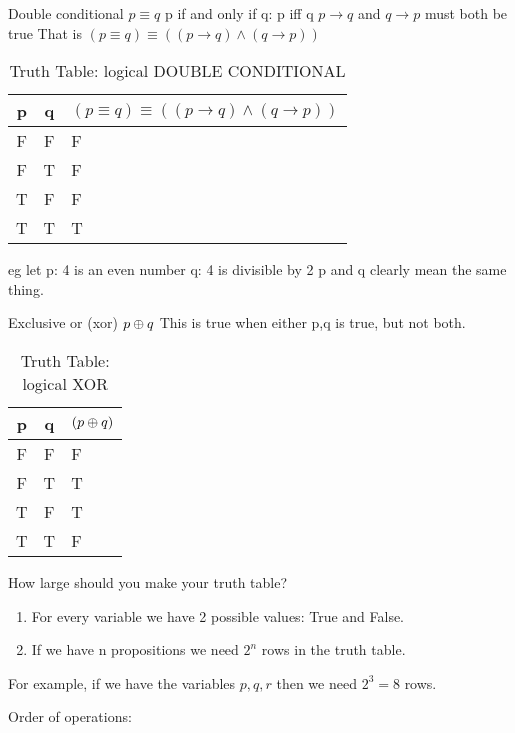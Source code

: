 Double conditional $ p \equiv q $
p if and only if q: p iff q
$p \to q$ and $q \to p$ must both be true
That is $(p \equiv q) \equiv (( p \to q) \land (q \to p))$

\begin{table}[!htb]
\label{tab:TruthTableEQUIVALENCE}
\begin{tabularx}{\linewidth}{| c | c | X |} \hline
  p & q & $( p \equiv q ) \equiv (( p \to q) \land (q \to p))$
                                                    \\ \hline \hline
  F & F & F \\ \hline
  F & T & F \\ \hline
  T & F & F \\ \hline
  T & T & T \\ \hline
\end{tabularx}
\caption{Truth Table: logical DOUBLE CONDITIONAL}
\end{table}

eg let p: 4 is an even number
       q: 4 is divisible by 2
       p and q clearly mean the same thing.
       
Exclusive or (xor) $p \oplus q$
This is true when either p,q is true, but not both.

\begin{table}[!htb]
\label{tab:TruthTableXOR}
\begin{tabularx}{\linewidth}{| c | c | X |} \hline
  p & q & $( p \oplus q )$ \\ \hline \hline
  F & F & F \\ \hline
  F & T & T \\ \hline
  T & F & T \\ \hline
  T & T & F \\ \hline
\end{tabularx}
\caption{Truth Table: logical XOR}
\end{table}

How large should you make your truth table?
\begin{enumerate}
  \item For every variable we have 2 possible values: True and False.
  \item If we have n propositions we need ${2}^{n}$ rows in the truth table.
\end{enumerate}
For example, if we have the variables $p,q,r$ then we need ${2}^{3} = 8$ rows.


Order of operations:


